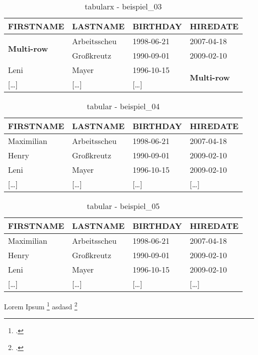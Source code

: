 \begin{table}[H]
  \ttfamily
  \begin{tabularx}{\textwidth}{X|X|X|X}
    \textbf{FIRSTNAME} & \textbf{LASTNAME} & \textbf{BIRTHDAY} & \textbf{HIREDATE} \\
    \hline\hline
    \multirow{2}{*}{\textbf{Multi-row}} & Arbeitsscheu & 1998-06-21 & 2007-04-18 \\
    & Großkreutz & 1990-09-01 & 2009-02-10 \\
    Leni & Mayer & 1996-10-15 & \multirow{2}{*}{\textbf{Multi-row}} \\
    $[$\dots$]$ & $[$\dots$]$ & $[$\dots$]$ & \\
    \hline
  \end{tabularx}
  \caption{tabularx - beispiel\_03}
  \label{tbl:beispiel_03}
\end{table}


\begin{table}[H]
  \ttfamily
  \begin{tabular}{l|l|l|l}
    \cellcolor{light-grey} \textbf{FIRSTNAME} & \textbf{LASTNAME} & \textbf{BIRTHDAY} & \cellcolor{grey} \textbf{HIREDATE} \\
    \hline\hline
    Maximilian & Arbeitsscheu & \cellcolor{orange}1998-06-21 & 2007-04-18 \\
    Henry & \cellcolor{red} Großkreutz & 1990-09-01 & 2009-02-10 \\
    \cellcolor{green} Leni & Mayer & 1996-10-15 & \cellcolor{blue} 2009-02-10 \\
    $[$\dots$]$ & \cellcolor{yellow} $[$\dots$]$ & \cellcolor{brown} $[$\dots$]$ & $[$\dots$]$ \\
  \end{tabular}
  \caption{tabular - beispiel\_04}
  \label{tbl:beispiel_04}
\end{table}


\begin{table}[H]
  \begin{tabular}{llll}
    \toprule[2pt]
    \cellcolor{light-grey} \textbf{FIRSTNAME} & \textbf{LASTNAME} & \textbf{BIRTHDAY} & \cellcolor{grey} \textbf{HIREDATE} \\ \midrule[1.5pt]
    Maximilian & Arbeitsscheu & \cellcolor{orange}1998-06-21 & 2007-04-18 \\ \midrule
    Henry & \cellcolor{red} Großkreutz & 1990-09-01 & 2009-02-10 \\ \midrule
    \cellcolor{green} Leni & Mayer & 1996-10-15 & \cellcolor{blue} 2009-02-10 \\ \midrule
    $[$\dots$]$ & \cellcolor{yellow} $[$\dots$]$ & \cellcolor{brown} $[$\dots$]$ & $[$\dots$]$ \\
    \bottomrule
  \end{tabular}
  \caption{tabular - beispiel\_05}
  \label{tbl:beispiel_05}
\end{table}


Lorem Ipsum \footcite{roy-thomas-fielding} asdasd \footcite{roy-thomas-fielding}